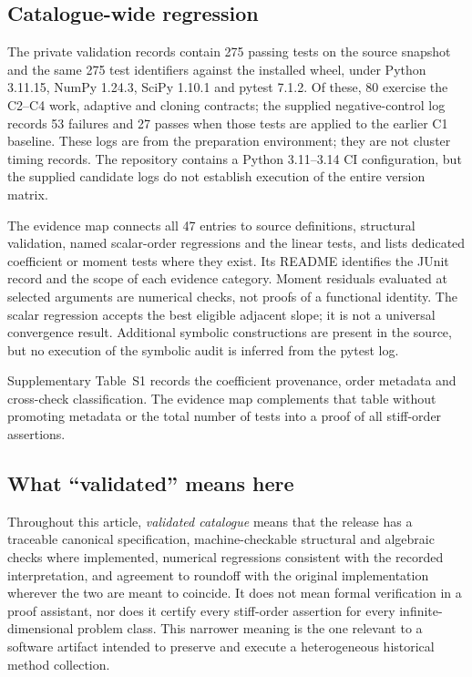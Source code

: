 \subsection{Catalogue-wide regression}

The private validation records contain 275 passing tests on the source
snapshot and the same 275 test identifiers against the installed wheel,
under Python 3.11.15, NumPy 1.24.3, SciPy 1.10.1 and pytest 7.1.2.  Of these,
80 exercise the C2--C4 work, adaptive and cloning contracts; the supplied
negative-control log records 53 failures and 27 passes when those tests are
applied to the earlier C1 baseline.  These logs are from the preparation
environment; they are not cluster timing records.  The repository contains
a Python 3.11--3.14 CI configuration, but the supplied candidate logs do not
establish execution of the entire version matrix.

The evidence map 
connects all 47 entries to source definitions, structural validation,
named scalar-order regressions and the linear tests, and lists dedicated
coefficient or moment tests where they exist.  Its README identifies the
JUnit record and the scope of each evidence category.  Moment residuals
evaluated at selected arguments are numerical checks, not proofs of a
functional identity.  The scalar regression accepts the best eligible
adjacent slope; it is not a universal convergence result.  Additional
symbolic constructions are present in the source, but no execution of the
symbolic audit is inferred from the pytest log.

Supplementary Table~S1 records the coefficient provenance, order metadata
and cross-check classification.  The evidence map complements that table
without promoting metadata or the total number of tests into a proof of
all stiff-order assertions.

\subsection{What ``validated'' means here}

Throughout this article, \emph{validated catalogue} means that the release has
a traceable canonical specification, machine-checkable structural and algebraic
checks where implemented, numerical regressions consistent with the recorded
interpretation, and agreement to roundoff with the original implementation
wherever the two are meant to coincide.  It does not mean formal verification
in a proof assistant, nor does it certify every stiff-order assertion for every
infinite-dimensional problem class.  This narrower meaning is the one relevant
to a software artifact intended to preserve and execute a heterogeneous
historical method collection.
